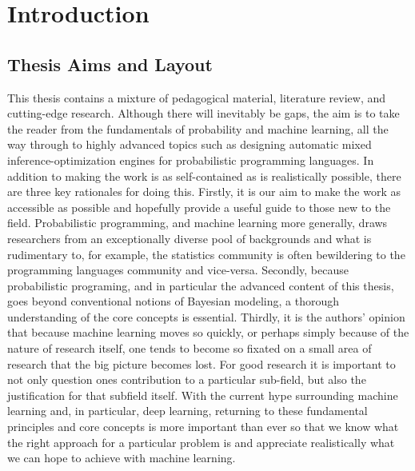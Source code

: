 
\chapter{Introduction}
\label{chp:intro}



\section{Thesis Aims and Layout}

This thesis contains a mixture of pedagogical material, literature review, and 
cutting-edge research.
Although there will inevitably be gaps, the aim is to take
the reader from the fundamentals of probability and machine learning,
all the way through to highly advanced topics such as designing automatic
mixed inference-optimization engines for probabilistic programming languages.
In addition to making the work is as self-contained as is realistically possible, there are
three key rationales for doing this.  Firstly, it is our aim to make the work 
as accessible as possible and hopefully provide a useful guide to those new to the field.
Probabilistic programming, and machine learning more generally, draws
researchers from an exceptionally diverse pool of backgrounds and what is rudimentary
to, for example, the statistics community is often bewildering to the programming
languages community and vice-versa. Secondly, because probabilistic programing, and 
in particular the advanced content of this thesis, goes beyond conventional notions of
Bayesian modeling, a thorough understanding of the core concepts is essential.
Thirdly, it is the authors' 
opinion that because machine learning moves so quickly, or perhaps simply because
of the nature of research itself, one tends to become so fixated on a small area of
research that the big picture becomes lost.  For good research it is important to not
only question ones contribution to a particular sub-field, but also the justification for
that subfield itself.  With the current hype surrounding machine learning and, in particular,
deep learning, returning to these
fundamental principles and core concepts is more important than ever so that we know 
what the right approach for a particular problem is and  appreciate realistically what we can
hope to achieve with machine learning.

